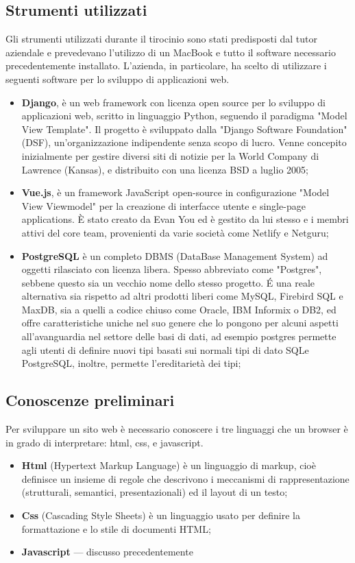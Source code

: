 \documentclass[12pt,a4paper]{article}
\begin{document}
\subsection{Strumenti utilizzati}
Gli strumenti utilizzati durante il tirocinio sono stati predisposti dal tutor aziendale e prevedevano l’utilizzo di un MacBook e tutto il software necessario precedentemente installato.
L'azienda, in particolare, ha scelto di utilizzare i seguenti software per lo sviluppo di applicazioni web.

\begin{itemize}
    \item \textbf{Django}, è un web framework con licenza open source per lo sviluppo di applicazioni web, scritto in linguaggio Python, seguendo il paradigma "Model View Template". Il progetto è sviluppato dalla "Django Software Foundation" (DSF), un'organizzazione indipendente senza scopo di lucro. Venne concepito inizialmente per gestire diversi siti di notizie per la World Company di Lawrence (Kansas), e distribuito con una licenza BSD a luglio 2005;

    \item \textbf{Vue.js}, è un framework JavaScript open-source in configurazione "Model View Viewmodel" per la creazione di interfacce utente e single-page applications. È stato creato da Evan You ed è gestito da lui stesso e i membri attivi del core team, provenienti da varie società come Netlify e Netguru;

    \item\textbf{PostgreSQL} è un completo DBMS (DataBase Management System) ad oggetti rilasciato con licenza libera. Spesso abbreviato come "Postgres", sebbene questo sia un vecchio nome dello stesso progetto. É una reale alternativa sia rispetto ad altri prodotti liberi come MySQL, Firebird SQL e MaxDB, sia a quelli a codice chiuso come Oracle, IBM Informix o DB2, ed offre caratteristiche uniche nel suo genere che lo pongono per alcuni aspetti all'avanguardia nel settore delle basi di dati, ad esempio postgres permette agli utenti di definire nuovi tipi basati sui normali tipi di dato SQLe PostgreSQL, inoltre, permette l'ereditarietà dei tipi;
\end{itemize}

\subsection{Conoscenze preliminari}
Per sviluppare un sito web è necessario conoscere i tre linguaggi che un browser è in grado di interpretare: html, css, e javascript.
\begin{itemize}
    \item \textbf{Html} (Hypertext Markup Language) è un linguaggio di markup, cioè definisce un insieme di regole che descrivono i meccanismi di rappresentazione (strutturali, semantici, presentazionali) ed il layout di un testo;
    \item \textbf{Css} (Cascading Style Sheets) è un linguaggio usato per definire la formattazione e lo stile di documenti HTML;
    \item \textbf{Javascript} --- discusso precedentemente
\end{itemize}
\end{document}
